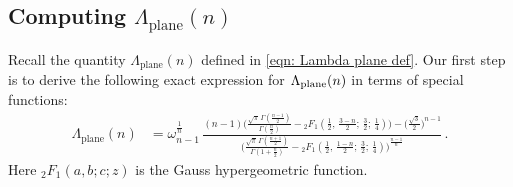 \documentclass[10pt,reqno]{amsart}
\numberwithin{equation}{section}
\theoremstyle{definition}
\newcommand{\Hcal}{\mathcal{H}}
\DeclareMathOperator{\lens}{lens}
\DeclareMathOperator{\plane}{plane}
\newcommand{\X}{\mathcal{X}}
\begin{document}
{{\subsection{Computing $\Lambda_{\plane}(n)$}
Recall the quantity $ \Lambda_{\plane}(n)$
defined in \eqref{eqn: Lambda plane def}. Our first step is to derive the following exact expression for $\Lambda_{\rm plane}(n)$ in terms of special functions:
\begin{align}\label{eq:final lambda plane expression}
    \Lambda_{\plane}(n) 
    & = \omega_{n-1}^{\frac{1}{n}} \, \frac{ (n-1)
\Big(\frac{\sqrt{\pi}\, \Gamma\left(\frac{n-1}{2}\right)}{\Gamma\left(\frac{n}{2}\right)} - {}_2F_1\left(\frac{1}{2}, \, \frac{3-{n}}{2} ; \,  \frac{3}{2} ; \,  \frac{1}{4}\right)\Big) - \Big(\frac{\sqrt{3}}{2}\Big)^{n-1}}{\Big(\frac{\sqrt{\pi}\,  \Gamma \left(\frac{n+1}{2}\right)}{\Gamma\left(1+\frac{{n}}{2}\right)}-{}_2F_1\left(\frac{1}{2},\, \frac{1-{n}}{2};  \, \frac{3}{2};\, \frac{1}{4}\right) \Big)^{\frac{n-1}{n}}}\,.
\end{align}
Here ${ }_2 F_1(a,b;c;z)$ is the Gauss hypergeometric function. 

}}
\end{document}
